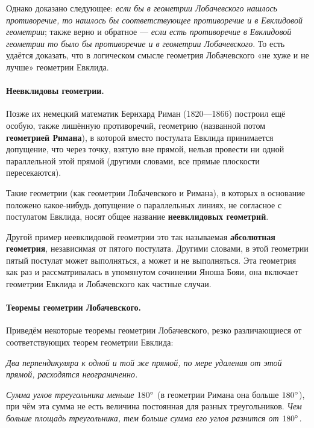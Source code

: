 Однако доказано следующее: \emph{если бы в геометрии Лобачевского нашлось противоречие, то нашлось бы соответствующее противоречие и в Евклидовой геометрии};
также верно и обратное — \emph{если есть противоречие в Евклидовой геометрии то  было бы  противоречие и в геометрии Лобачевского}.
То есть удаётся доказать, что в логическом смысле геометрия Лобачевского «не хуже и не лучше» геометрии Евклида.


\paragraph{Неевклидовы геометрии.}\label{1914/94} 
Позже их немецкий математик Бернхард Риман (1820—1866) построил ещё особую, также лишённую противоречий, геометрию (названной потом \textbf{геометрией Римана}),
в которой вместо постулата Евклида принимается допущение, что
через точку, взятую вне прямой, нельзя провести ни одной параллельной этой прямой (другими словами, все прямые плоскости пересекаются).

Такие геометрии (как геометрии Лобачевского и Римана), в которых в основание положено какое-нибудь допущение о параллельных линиях, не согласное с постулатом Евклида, носят общее название
\textbf{неевклидовых геометрий}.

Другой пример неевклидовой геометрии это так называемая \textbf{абсолютная геометрия}, независимая от пятого постулата.
Другими словами, в этой геометрии пятый постулат может выполняться, а может и не выполняться.
Эта геометрия как раз и рассматривалась в упомянутом сочинении Яноша Бояи,
она включает геометрии Евклида и Лобачевского как частные случаи.

\paragraph{Теоремы геометрии Лобачевского.}\label{1914/95} Приведём некоторые теоремы геометрии Лобачевского, резко различающиеся от соответствующих теорем геометрии Евклида:

\emph{Два перпендикуляра к одной и той же прямой, по мере удаления
от этой прямой, расходятся неограниченно.}

\emph{Сумма углов треугольника меньше $180\degree$} (в геометрии Римана она
больше $180\degree$), при чём эта сумма не есть величина постоянная для разных треугольников.
\emph{Чем больше площадь треугольника, тем больше сумма его углов разнится от $180\degree$.}



